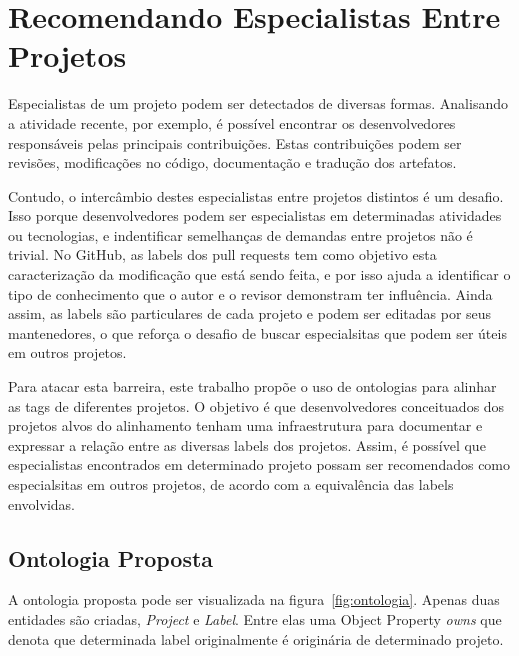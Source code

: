 \documentclass[sigconf]{acmart}
\begin{document}
\section{Recomendando Especialistas Entre Projetos}

Especialistas de um projeto podem ser detectados de diversas formas. Analisando a atividade recente, por exemplo, é possível encontrar os desenvolvedores responsáveis pelas principais contribuições. Estas contribuições podem ser revisões, modificações no código, documentação e tradução dos artefatos.

Contudo, o intercâmbio destes especialistas entre projetos distintos é um desafio. Isso porque desenvolvedores podem ser especialistas em determinadas atividades ou tecnologias, e indentificar semelhanças de demandas entre projetos não é trivial. No GitHub, as labels dos pull requests tem como objetivo esta caracterização da modificação que está sendo feita, e por isso ajuda a identificar o tipo de conhecimento que o autor e o revisor demonstram ter influência. Ainda assim, as labels são particulares de cada projeto e podem ser editadas por seus mantenedores, o que reforça o desafio de buscar especialsitas que podem ser úteis em outros projetos.

Para atacar esta barreira, este trabalho propõe o uso de ontologias para alinhar as tags de diferentes projetos. O objetivo é que desenvolvedores conceituados dos projetos alvos do alinhamento tenham uma infraestrutura para documentar e expressar a relação entre as diversas labels dos projetos. Assim, é possível que especialistas encontrados em determinado projeto possam ser recomendados como especialsitas em outros projetos, de acordo com a equivalência das labels envolvidas.

\subsection{Ontologia Proposta}

A ontologia proposta pode ser visualizada na figura~\ref{fig:ontologia}. Apenas duas entidades são criadas, \textit{Project} e \textit{Label}. Entre elas uma Object Property \textit{owns} que denota que determinada label originalmente é originária de determinado projeto.
\end{document}
